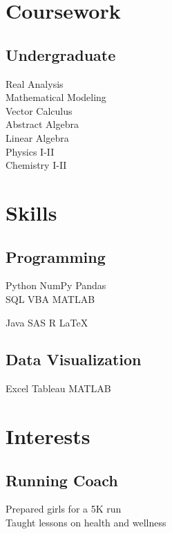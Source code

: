 \documentclass[]{deedy-resume-openfont}
\begin{document}
\begin{minipage}[t]{0.33\textwidth}

\section{Coursework}

\subsection{Undergraduate}
Real Analysis \\
Mathematical Modeling \\
Vector Calculus \\
Abstract Algebra \\
Linear Algebra \\
Physics I-II \\
Chemistry I-II
\sectionsep


\section{Skills}
\subsection{Programming}
Python \textbullet{}   NumPy \textbullet{} Pandas \\
SQL \textbullet{} VBA \textbullet{} MATLAB 
\sectionsep

Java \textbullet{} SAS \textbullet{} R  \textbullet{} \LaTeX\
\sectionsep

\subsection{Data Visualization}
Excel \textbullet{}   Tableau \textbullet{} MATLAB \\
\sectionsep



\section{Interests}
\subsection{Running Coach}
Prepared girls for a 5K run  \\
Taught lessons on health and wellness
\sectionsep


\end{minipage}
\end{document}
